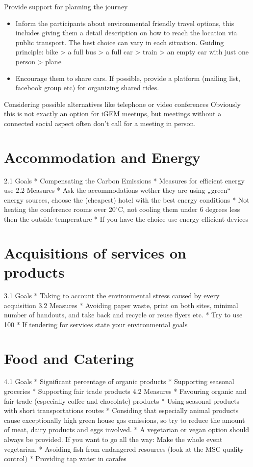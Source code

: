 \begin{suggest}{Provide support for planning the journey}
	\vspace{-2\topsep}
	\begin{itemize}
		\item Inform the participants about environmental friendly travel options, this includes giving them a detail description on how to reach the location via public transport. The best choice can vary in each situation. Guiding principle: bike > a full bus > a full car > train > an empty car with just one person > plane
		\item Encourage them to share cars. If possible, provide a platform (mailing list, facebook group etc) for organizing shared rides.
	\end{itemize}	
\end{suggest}

\begin{suggest}{Considering possible alternatives like telephone or video conferences}
	Obviously this is not exactly an option for iGEM meetups, but meetings without a connected social aspect often don't call for a meeting in person.
\end{suggest}

\section{Accommodation and Energy}
2.1 Goals
*	Compensating the Carbon Emissions
*	Measures for efficient energy use
2.2 Measures
*	Ask the accommodations wether they are using „green“ energy sources, choose the (cheapest) hotel with the best energy conditions
*	Not heating the conference rooms over 20$^\circ$C, not cooling them under 6 degrees less then the outside temperature
*	If you have the choice use energy efficient devices

\section{Acquisitions of services on products}
3.1 Goals 
*	Taking to account the environmental stress caused by every acquisition 
3.2 Measures
*	Avoiding paper waste, print on both sites, minimal number of handouts, and take back and recycle or reuse flyers etc.
*	Try to use 100%
*	If tendering for services state your environmental goals
\section{Food and Catering}
4.1 Goals
*	Significant percentage of organic products
*	Supporting seasonal groceries 
*	Supporting fair trade products
4.2 Measures
*	Favouring organic and fair trade (especially coffee and chocolate) products
*	Using seasonal products with short transportations routes
*	Considing that especially animal products cause exceptionally high green house gas emissions, so try to reduce the amount of meat, dairy products and eggs involved.
*	A vegetarian or vegan option should always be provided. If you want to go all the way: Make the whole event vegetarian.
*	Avoiding fish from endangered resources  (look at the MSC quality control)
*	Providing tap water in carafes

